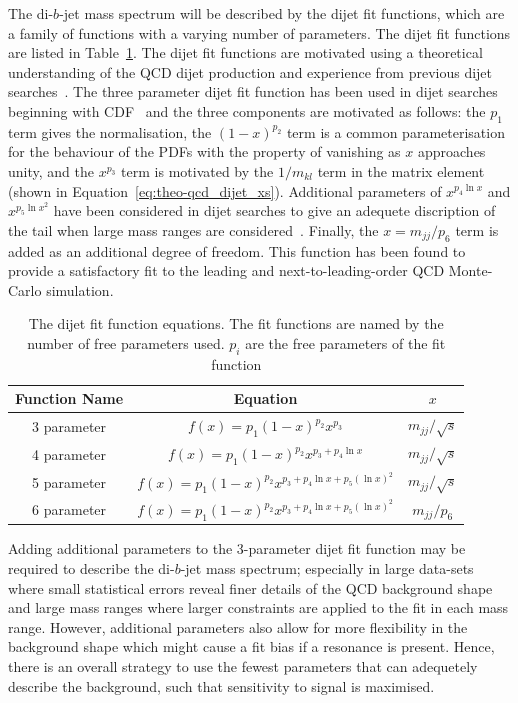 The di-$b$-jet mass spectrum will be described by the dijet fit functions,
which are a family of functions with a varying number of parameters.
The dijet fit functions are listed in Table~\ref{tab:bkg-fit}.
The dijet fit functions are motivated using a theoretical understanding of the QCD dijet production
and experience from previous dijet searches~\cite{theo-dijet_harris}.
The three parameter dijet fit function has been used in dijet searches beginning with CDF~\cite{dijet-CDF_3par}
and the three components are motivated as follows:
the $p_1$ term gives the normalisation,
the $(1-x)^{p_2}$ term is a common parameterisation for the behaviour of the PDFs with the property of vanishing as $x$ approaches unity,
and the $x^{p_3}$ term is motivated by the $1/m_{kl}$ term in the matrix element (shown in Equation~\ref{eq:theo-qcd_dijet_xs}).
Additional parameters of $x^{p_4\ln{x}}$ and $x^{p_5\ln{x}^{2}}$ have been considered in dijet searches to give an adequete discription of the tail
when large mass ranges are considered~\cite{dijet-CDF_4par,dijet-mori16_int}.
Finally, the $x=m_{jj}/p_6$ term is added as an additional degree of freedom.
This function has been found to provide a satisfactory fit to the leading and next-to-leading-order QCD Monte-Carlo simulation.

{\renewcommand{\arraystretch}{1.2}
\begin{table}[!thb]
\centering
\begin{tabular}{|c||c|c|}
  \hline
  Function Name & Equation                                          & $x$ \\
  \hline
  3 parameter   & $f(x)=p_1(1-x)^{p_2}x^{p_3}$                         & $m_{jj}/\sqrt{s}$ \\
  4 parameter   & $f(x)=p_1(1-x)^{p_2}x^{p_3+p_4\ln{x}}$                &$m_{jj}/\sqrt{s}$\\
  5 parameter   & $f(x)=p_1(1-x)^{p_2}x^{p_3+p_4\ln{x}+p_5(\ln{x})^{2}}$   & $m_{jj}/\sqrt{s}$\\ 
  6 parameter   & $f(x)=p_1(1-x)^{p_2}x^{p_3+p_4\ln{x}+p_5(\ln{x})^{2}}$   &  $m_{jj}/p_6$\\ 
  \hline
\end{tabular}
\caption{The dijet fit function equations. The fit functions are named by the number of free parameters used. $p_{i}$ are the free parameters of the fit function}
\label{tab:bkg-fit}
\end{table}}

Adding additional parameters to the 3-parameter dijet fit function may be required to describe the di-$b$-jet mass spectrum;
especially in large data-sets where small statistical errors reveal finer details of the QCD background shape
and large mass ranges where larger constraints are applied to the fit in each mass range.
However, additional parameters also allow for more flexibility in the background shape
which might cause a fit bias if a resonance is present.
Hence, there is an overall strategy to use the fewest parameters
that can adequetely describe the background,
such that sensitivity to signal is maximised.

